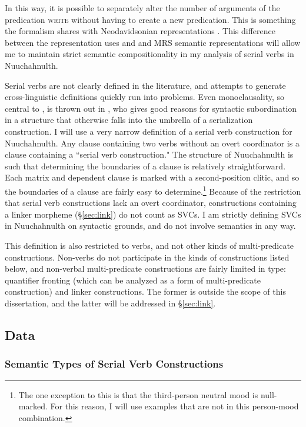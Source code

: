 In this way, it is possible to separately alter the number of arguments of the predication \textsc{write} without having to create a new predication. This is something the formalism shares with Neodavidsonian representations \citep{parsons1990}. This difference between the representation \citeauthor{butt1995} uses and and MRS semantic representations will allow me to maintain strict semantic compositionality in my analysis of serial verbs in Nuuchahnulth.

Serial verbs are not clearly defined in the literature, and attempts to generate cross-linguistic definitions quickly run into problems. Even monoclausality, so central to \cite{aikhenvalddixon2006}, is thrown out in \cite{butt1995}, who gives good reasons for syntactic subordination in a structure that otherwise falls into the umbrella of a serialization construction. I will use a very narrow definition of a serial verb construction for Nuuchahnulth. Any clause containing two verbs without an overt coordinator is a clause containing a ``serial verb construction." The structure of Nuuchahnulth is such that determining the boundaries of a clause is relatively straightforward. Each matrix and dependent clause is marked with a second-position clitic, and so the boundaries of a clause are fairly easy to determine.\footnote{The one exception to this is that the third-person neutral mood is null-marked. For this reason, I will use examples that are not in this person-mood combination.} Because of the restriction that serial verb constructions lack an overt coordinator, constructions containing a linker morpheme (\S\ref{sec:link}) do not count as SVCs. I am strictly defining SVCs in Nuuchahnulth on syntactic grounds, and do not involve semantics in any way.

This definition is also restricted to verbs, and not other kinds of multi-predicate constructions. Non-verbs do not participate in the kinds of constructions listed below, and non-verbal multi-predicate constructions are fairly limited in type: quantifier fronting (which can be analyzed as a form of multi-predicate construction) and linker constructions. The former is outside the scope of this dissertation, and the latter will be addressed in \S\ref{sec:link}.

\subsection{Data} \label{sec:sv:data}

\subsubsection{Semantic Types of Serial Verb Constructions}

